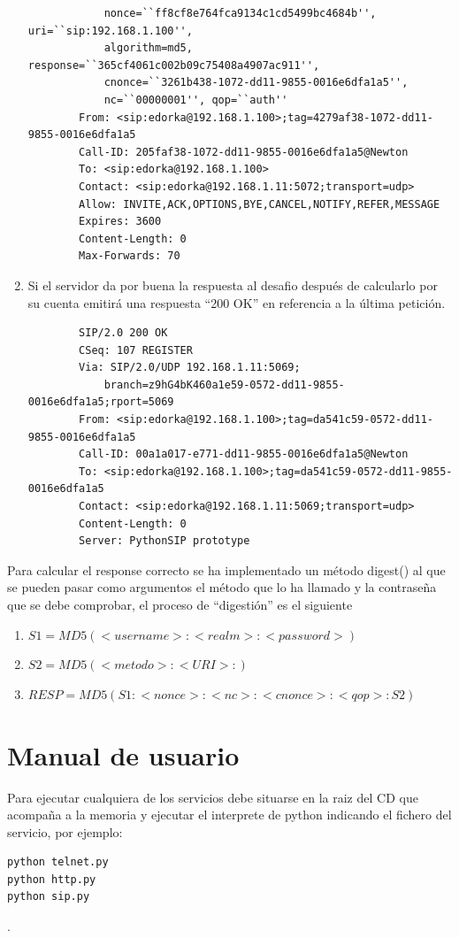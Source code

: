 \documentclass[a4paper,spanish,12pt]{book}
\begin{document}
\begin{enumerate}
\begin{verbatim}
			nonce=``ff8cf8e764fca9134c1cd5499bc4684b'', uri=``sip:192.168.1.100'', 
			algorithm=md5, response=``365cf4061c002b09c75408a4907ac911'', 
			cnonce=``3261b438-1072-dd11-9855-0016e6dfa1a5'', 
			nc=``00000001'', qop=``auth''
		From: <sip:edorka@192.168.1.100>;tag=4279af38-1072-dd11-9855-0016e6dfa1a5
		Call-ID: 205faf38-1072-dd11-9855-0016e6dfa1a5@Newton
		To: <sip:edorka@192.168.1.100>
		Contact: <sip:edorka@192.168.1.11:5072;transport=udp>
		Allow: INVITE,ACK,OPTIONS,BYE,CANCEL,NOTIFY,REFER,MESSAGE
		Expires: 3600
		Content-Length: 0
		Max-Forwards: 70
		\end{verbatim}
		\normalsize
	\item Si el servidor da por buena la respuesta al desafio despu\'es de calcularlo por su cuenta emitirá una respuesta ``200 OK'' en referencia a la última petición.
		\scriptsize
		\begin{verbatim}
		SIP/2.0 200 OK
		CSeq: 107 REGISTER
		Via: SIP/2.0/UDP 192.168.1.11:5069;
			branch=z9hG4bK460a1e59-0572-dd11-9855-0016e6dfa1a5;rport=5069
		From: <sip:edorka@192.168.1.100>;tag=da541c59-0572-dd11-9855-0016e6dfa1a5
		Call-ID: 00a1a017-e771-dd11-9855-0016e6dfa1a5@Newton
		To: <sip:edorka@192.168.1.100>;tag=da541c59-0572-dd11-9855-0016e6dfa1a5
		Contact: <sip:edorka@192.168.1.11:5069;transport=udp>
		Content-Length: 0
		Server: PythonSIP prototype
		\end{verbatim}
		\normalsize
\end{enumerate}
Para calcular el response correcto se ha implementado un m\'etodo digest() al que se pueden pasar como argumentos el m\'etodo que lo ha llamado y la contraseña que se debe comprobar, el proceso de ``digestión'' es el siguiente
\begin{enumerate}
	\item \begin{math} S1 = MD5(<username>:<realm>:<password>) \end{math}
	\item \begin{math} S2 = MD5(<metodo>:<URI>:) \end{math}
	\item \begin{math} RESP = MD5(S1:<nonce>:<nc>:<cnonce>:<qop>:S2) \end{math}
\end{enumerate}
\section{Manual de usuario}
Para ejecutar cualquiera de los servicios debe situarse en la raiz del CD que acompaña a la memoria y ejecutar el interprete de python indicando el fichero del servicio, por ejemplo:
\begin{verbatim}
python telnet.py
python http.py
python sip.py
\end{verbatim}.
\end{document}
